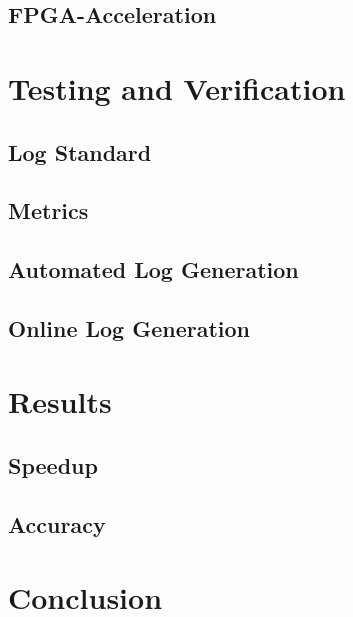 \documentclass[mscthesis]{usiinfthesis}
\begin{document}
\section{FPGA-Acceleration}

\chapter{Testing and Verification}
\section{Log Standard}
\section{Metrics}
\section{Automated Log Generation}
\section{Online Log Generation}

\chapter{Results}
\section{Speedup}
\section{Accuracy}

\chapter{Conclusion}
\end{document}
